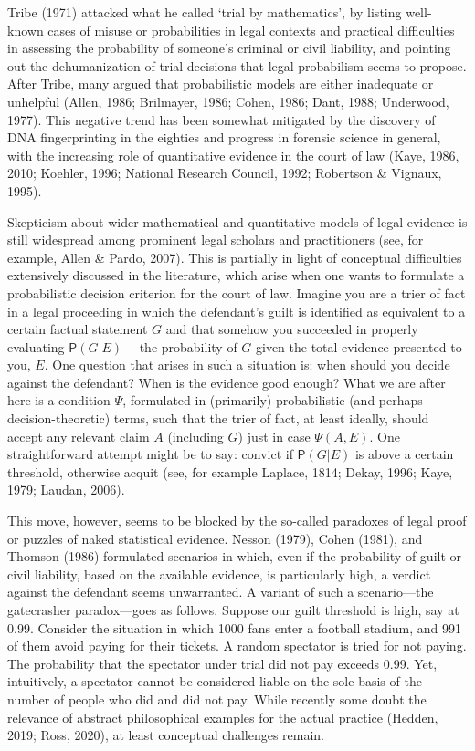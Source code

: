 \documentclass[11pt,dvipsnames,enabledeprecatedfontcommands]{scrartcl}
\newcommand{\pr}[1]{\mathsf{P}(#1)}
\begin{document}
Tribe (1971) attacked what he called `trial by mathematics', by listing
well-known cases of misuse or probabilities in legal contexts and
practical difficulties in assessing the probability of someone's
criminal or civil liability, and pointing out the dehumanization of
trial decisions that legal probabilism seems to propose. After Tribe,
many argued that probabilistic models are either inadequate or unhelpful
(Allen, 1986; Brilmayer, 1986; Cohen, 1986; Dant, 1988; Underwood,
1977). This negative trend has been somewhat mitigated by the discovery
of DNA fingerprinting in the eighties and progress in forensic science
in general, with the increasing role of quantitative evidence in the
court of law (Kaye, 1986, 2010; Koehler, 1996; National Research
Council, 1992; Robertson \& Vignaux, 1995).

Skepticism about wider mathematical and quantitative models of legal
evidence is still widespread among prominent legal scholars and
practitioners (see, for example, Allen \& Pardo, 2007). This is
partially in light of conceptual difficulties extensively discussed in
the literature, which arise when one wants to formulate a probabilistic
decision criterion for the court of law. Imagine you are a trier of fact
in a legal proceeding in which the defendant's guilt is identified as
equivalent to a certain factual statement \(G\) and that somehow you
succeeded in properly evaluating \(\pr{G\vert E}\)----the probability of
\(G\) given the total evidence presented to you, \(E\). One question
that arises in such a situation is: when should you decide against the
defendant? When is the evidence good enough? What we are after here is a
condition \(\Psi\), formulated in (primarily) probabilistic (and perhaps
decision-theoretic) terms, such that the trier of fact, at least
ideally, should accept any relevant claim \(A\) (including \(G\)) just
in case \(\Psi(A, E)\). One straightforward attempt might be to say:
convict if \(\pr{G\vert E}\) is above a certain threshold, otherwise
acquit (see, for example Laplace, 1814; Dekay, 1996; Kaye, 1979; Laudan,
2006).

This move, however, seems to be blocked by the so-called paradoxes of
legal proof or puzzles of naked statistical evidence. Nesson (1979),
Cohen (1981), and Thomson (1986) formulated scenarios in which, even if
the probability of guilt or civil liability, based on the available
evidence, is particularly high, a verdict against the defendant seems
unwarranted. A variant of such a scenario---the gatecrasher
paradox---goes as follows. Suppose our guilt threshold is high, say at
0.99. Consider the situation in which 1000 fans enter a football
stadium, and 991 of them avoid paying for their tickets. A random
spectator is tried for not paying. The probability that the spectator
under trial did not pay exceeds 0.99. Yet, intuitively, a spectator
cannot be considered liable on the sole basis of the number of people
who did and did not pay. While recently some doubt the relevance of
abstract philosophical examples for the actual practice (Hedden, 2019;
Ross, 2020), at least conceptual challenges remain.
\end{document}
